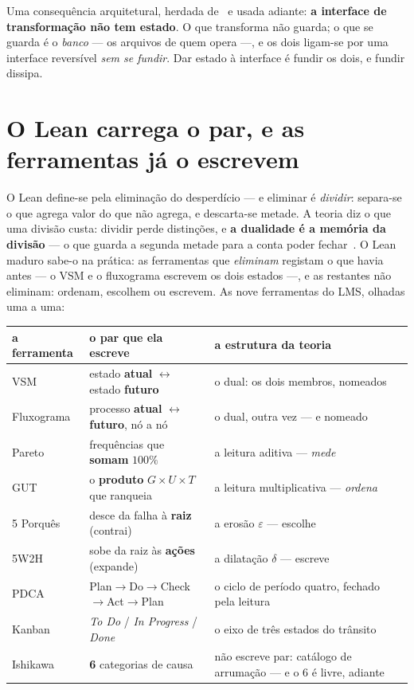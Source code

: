 \documentclass[11pt,a4paper]{article}
\begin{document}
\noindent Uma consequência arquitetural, herdada de~\cite{arquitetura} e usada adiante: \textbf{a
interface de transformação não tem estado}. O que transforma não guarda; o que se guarda é o
\emph{banco} --- os arquivos de quem opera ---, e os dois ligam-se por uma interface reversível
\emph{sem se fundir}. Dar estado à interface é fundir os dois, e fundir dissipa.

\section{O Lean carrega o par, e as ferramentas já o escrevem}\label{sec:lean}

O Lean define-se pela eliminação do desperdício --- e eliminar é \emph{dividir}: separa-se o que
agrega valor do que não agrega, e descarta-se metade. A teoria diz o que uma divisão custa: dividir
perde distinções, e \textbf{a dualidade é a memória da divisão} --- o que guarda a segunda metade para
a conta poder fechar~\cite{teoria}. O Lean maduro sabe-o na prática: as ferramentas que
\emph{eliminam} registam o que havia antes --- o VSM e o fluxograma escrevem os dois estados ---, e as
restantes não eliminam: ordenam, escolhem ou escrevem. As nove ferramentas do LMS, olhadas uma a uma:

\begin{center}\small
\begin{tabular}{@{}lll@{}}
\toprule
a ferramenta & o par que ela escreve & a estrutura da teoria \\
\midrule
VSM & estado \textbf{atual} $\leftrightarrow$ estado \textbf{futuro} & o dual: os dois membros, nomeados \\
Fluxograma & processo \textbf{atual} $\leftrightarrow$ \textbf{futuro}, nó a nó & o dual, outra vez --- e nomeado \\
Pareto & frequências que \textbf{somam} $100\%$ & a leitura aditiva --- \emph{mede} \\
GUT & o \textbf{produto} $G\times U\times T$ que ranqueia & a leitura multiplicativa --- \emph{ordena} \\
5 Porquês & desce da falha à \textbf{raiz} (contrai) & a erosão $\varepsilon$ --- escolhe \\
5W2H & sobe da raiz às \textbf{ações} (expande) & a dilatação $\delta$ --- escreve \\
PDCA & Plan$\to$Do$\to$Check$\to$Act$\to$Plan & o ciclo de período quatro, fechado pela leitura \\
Kanban & \emph{To Do} / \emph{In Progress} / \emph{Done} & o eixo de três estados do trânsito \\
Ishikawa & \textbf{6} categorias de causa & não escreve par: catálogo de arrumação --- e o $6$ é livre, adiante \\
\bottomrule
\end{tabular}
\end{center}
\end{document}
